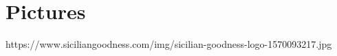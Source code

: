 \section{Pictures}
https://www.siciliangoodness.com/img/sicilian-goodness-logo-1570093217.jpg

\pagebreak